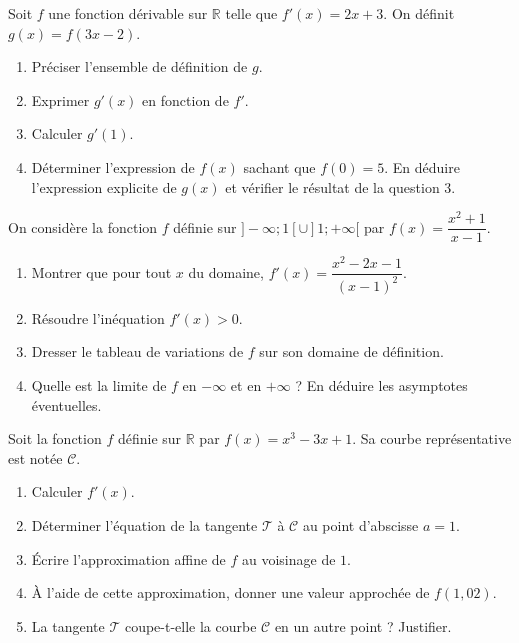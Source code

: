 \documentclass[11pt]{article}
\begin{document}
\begin{exercice}
Soit $f$ une fonction dérivable sur $\mathbb{R}$ telle que $f'(x) = 2x+3$.
On définit $g(x) = f(3x-2)$.
\begin{enumerate}
    \item Préciser l'ensemble de définition de $g$.
    \item Exprimer $g'(x)$ en fonction de $f'$.
    \item Calculer $g'(1)$.
    \item Déterminer l'expression de $f(x)$ sachant que $f(0)=5$. En déduire l'expression explicite de $g(x)$ et vérifier le résultat de la question 3.
\end{enumerate}
\end{exercice}

\begin{exercice}
On considère la fonction $f$ définie sur $]-\infty; 1[ \cup ]1; +\infty[$ par $f(x) = \dfrac{x^2+1}{x-1}$.
\begin{enumerate}
    \item Montrer que pour tout $x$ du domaine, $f'(x) = \dfrac{x^2-2x-1}{(x-1)^2}$.
    \item Résoudre l'inéquation $f'(x) > 0$.
    \item Dresser le tableau de variations de $f$ sur son domaine de définition.
    \item Quelle est la limite de $f$ en $-\infty$ et en $+\infty$ ? En déduire les asymptotes éventuelles.
\end{enumerate}
\end{exercice}

\begin{exercice}
Soit la fonction $f$ définie sur $\mathbb{R}$ par $f(x) = x^3 - 3x + 1$. Sa courbe représentative est notée $\mathcal{C}$.
\begin{enumerate}
    \item Calculer $f'(x)$.
    \item Déterminer l'équation de la tangente $\mathcal{T}$ à $\mathcal{C}$ au point d'abscisse $a=1$.
    \item Écrire l'approximation affine de $f$ au voisinage de $1$.
    \item À l'aide de cette approximation, donner une valeur approchée de $f(1,02)$.
    \item La tangente $\mathcal{T}$ coupe-t-elle la courbe $\mathcal{C}$ en un autre point ? Justifier.
\end{enumerate}
\end{exercice}
\end{document}

